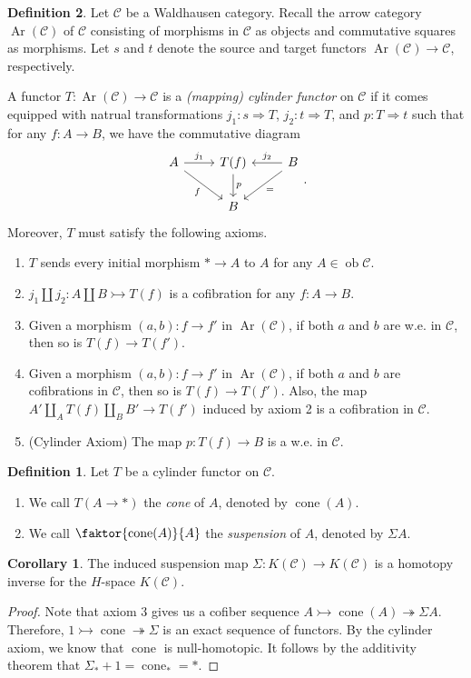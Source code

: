 \documentclass[10pt,letterpaper,cm]{nupset}
\theoremstyle{definition}
\newtheorem*{definition}{Definition}
\newtheorem{corollary}{Corollary}
\newcommand{\1}{\mathbf{1}}
\renewcommand{\c}{\mathscr{C}}
\newcommand{\0}{\vec 0}
\DeclareMathOperator{\ob}{ob}
\DeclareMathOperator{\Ar}{Ar}
\DeclareMathOperator{\cone}{cone}
\begin{document}
\begin{definition}
Let $\c$ be a Waldhausen category. Recall the arrow category $\Ar(\c)$ of $\c$ consisting of morphisms in $\c$ as objects and commutative squares as morphisms. Let $s$ and $t$ denote the source and target functors $\Ar(\c)\to \c$, respectively. 

A functor $T: \Ar(\c) \to \c$ is a \textit{(mapping) cylinder functor} on $\c$ if it comes equipped with natrual transformations $j_1 :  s \Rightarrow T$, $j_2 : t \Rightarrow T$, and $p: T \Rightarrow t$ such that for any $f: A \to B$, we have the commutative diagram
\[
\begin{tikzcd}
A \arrow[r, "j_1"] \arrow[rd, "f"'] & T(f) \arrow[d, "p"] & B \arrow[l, "j_2"'] \arrow[ld, "="] \\
 & B & 
\end{tikzcd}
. \]
Moreover, $T$ must satisfy the following axioms.
\begin{enumerate}
\item $T$ sends every initial morphism $\ast \to A$ to $A$ for any $A \in \ob \c$.
\item $j_1 \coprod j_2 : A \coprod B \rightarrowtail T(f)$ is a cofibration for any $f: A \to B$.
\item Given a morphism $(a,b) : f \to f'$ in $\Ar(\c)$, if both $a$ and $b$ are w.e. in $\c$, then so is $T(f) \to T(f').$
\item Given a morphism $(a,b) : f \to f'$ in $\Ar(\c)$, if both $a$ and $b$ are cofibrations in $\c$, then so is $T(f) \to T(f')$. Also, the map $A' \coprod_A T(f) \coprod_B B' \to T(f')$ induced by axiom 2 is a cofibration in $\c$.
\item {(Cylinder Axiom)} The map $p: T(f) \to B$ is a w.e. in $\c$.
\end{enumerate}
\begin{definition} Let $T$ be a cylinder functor on $\c$.
\begin{enumerate}
\item We call $T(A \to \ast)$ the \textit{cone} of $A$, denoted by $\cone(A)$.
\item We call $\faktor{\cone(A)}{A}$ the \textit{suspension} of $A$, denoted by $\Sigma A$. 
\end{enumerate}
\end{definition}
\begin{corollary}
The induced suspension map $\Sigma : K(\c) \to K(\c)$ is a homotopy inverse for the $H$-space $K(\c)$.
\end{corollary}
\begin{proof}
Note that axiom 3 gives us a cofiber sequence $A \rightarrowtail \cone(A) \twoheadrightarrow \Sigma A$. Therefore, $1 \rightarrowtail \cone \twoheadrightarrow \Sigma$ is an exact sequence of functors. By the cylinder axiom, we know that $\cone$ is null-homotopic. It follows by the additivity theorem that $\Sigma_{\ast} + 1 =  \cone_{\ast} = \ast$.
\end{proof}
\end{definition}
\end{document}
